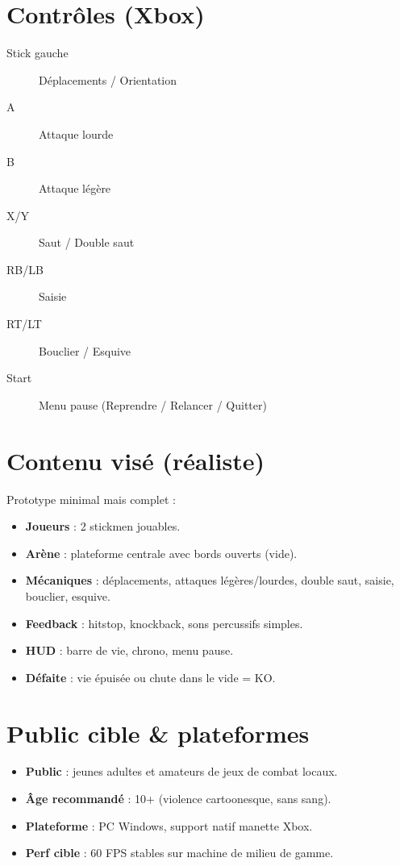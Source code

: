 \documentclass[10.8pt,letterpaper]{article}
\begin{document}
\begin{multicols}{2}
\section*{Contrôles (Xbox)}
\begin{description}
  \item[Stick gauche] Déplacements / Orientation
  \item[A] Attaque lourde
  \item[B] Attaque légère
  \item[X/Y] Saut / Double saut
  \item[RB/LB] Saisie
  \item[RT/LT] Bouclier / Esquive
  \item[Start] Menu pause (Reprendre / Relancer / Quitter)
\end{description}

\section*{Contenu visé (réaliste)}
Prototype minimal mais complet :  
\begin{itemize}
  \item \textbf{Joueurs} : 2 stickmen jouables.
  \item \textbf{Arène} : plateforme centrale avec bords ouverts (vide).
  \item \textbf{Mécaniques} : déplacements, attaques légères/lourdes, double saut, saisie, bouclier, esquive.
  \item \textbf{Feedback} : hitstop, knockback, sons percussifs simples.
  \item \textbf{HUD} : barre de vie, chrono, menu pause.
  \item \textbf{Défaite} : vie épuisée ou chute dans le vide = KO.
\end{itemize}

\section*{Public cible \& plateformes}
\begin{itemize}
  \item \textbf{Public} : jeunes adultes et amateurs de jeux de combat locaux.
  \item \textbf{Âge recommandé} : 10+ (violence cartoonesque, sans sang).
  \item \textbf{Plateforme} : PC Windows, support natif manette Xbox.
  \item \textbf{Perf cible} : 60 FPS stables sur machine de milieu de gamme.
\end{itemize}


\end{multicols}
\end{document}

